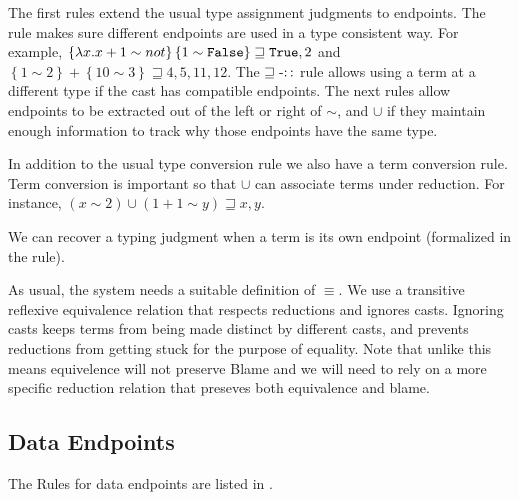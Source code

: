 The first rules extend the usual type assignment judgments to endpoints.
The  rule makes sure different endpoints are used in a type consistent way.
For example, $\left\{ \lambda x.x+1\sim not\right\} \left\{ 1\sim \mathtt{False}{} \right\} \sqsupseteq \mathtt{True}{} ,2$ and $\left\{ 1\sim2\right\} +\left\{ 10\sim3\right\} \sqsupseteq4,5,11,12$.
The $\operatorname{\sqsupseteq-::}$ rule allows using a term at a different type if the cast has compatible endpoints.
The next rules allow endpoints to be extracted out of the left or right of $\sim$, and $\cup$ if they maintain enough information to track why those endpoints have the same type.

In addition to the usual type conversion rule we also have a term conversion rule.
Term conversion is important so that $\cup$ can associate terms under reduction.
For instance, $\left(x\sim2\right)\cup\left(1+1\sim y\right)\sqsupseteq x, y$.

We can recover a typing judgment when a term is its own endpoint (formalized in the  rule).
 
As usual, the system needs a suitable definition of $\equiv$.
We use a transitive reflexive equivalence relation that respects reductions and ignores casts.
Ignoring casts keeps terms from being made distinct by different casts, and prevents reductions from getting stuck for the purpose of equality.
Note that unlike  this means equivelence will not preserve Blame and we will need to rely on a more specific reduction relation that preseves both equivalence and blame.


\subsection{Data Endpoints}

The Rules for data endpoints are listed in .

